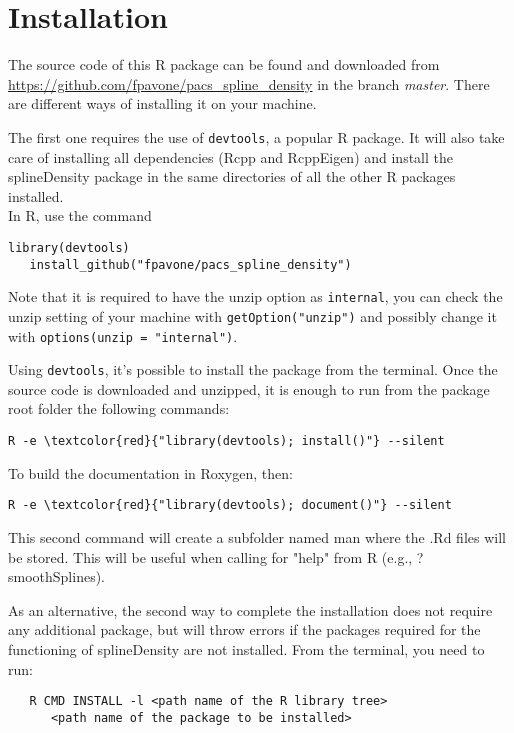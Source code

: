 \chapter{Installation}
\label{installation}

\noindent 
The source code of this R package can be found and downloaded from \url{https://github.com/fpavone/pacs_spline_density} in the branch \textit{master}. 
There are different ways of installing it on your machine.

The first one requires the use of \verb|devtools|, a popular R package. It will also take care of installing all dependencies (Rcpp and RcppEigen) and install the splineDensity package in the same directories of all the other R packages installed.  \\
In R, use the command 
\begin{Verbatim}[commandchars=\\\{\}]
   library(devtools)
   install_github("fpavone/pacs_spline_density")
\end{Verbatim}
Note that it is required to have the unzip option as \verb|internal|, you can check the unzip setting of your machine with \verb|getOption("unzip")| and possibly change it with \verb|options(unzip = "internal")|.

Using \verb|devtools|, it's possible to install the package from the terminal.
Once the source code is downloaded and unzipped, it is enough to run from the package root folder the following commands:
\begin{Verbatim}[commandchars=\\\{\}]
   R -e \textcolor{red}{"library(devtools); install()"} --silent
\end{Verbatim}
To build the documentation in Roxygen, then:
\begin{Verbatim}[commandchars=\\\{\}]
   R -e \textcolor{red}{"library(devtools); document()"} --silent
\end{Verbatim}

This second command will create a subfolder named man where the .Rd files will be stored. This will be useful when calling for "help" from R (e.g., ?smoothSplines).

As an alternative, the second way to complete the installation does not require any additional package, but will throw errors if the packages required for the functioning of splineDensity are not installed.
From the terminal, you need to run:
\begin{verbatim}
   R CMD INSTALL -l <path name of the R library tree> 
      <path name of the package to be installed>
\end{verbatim}

